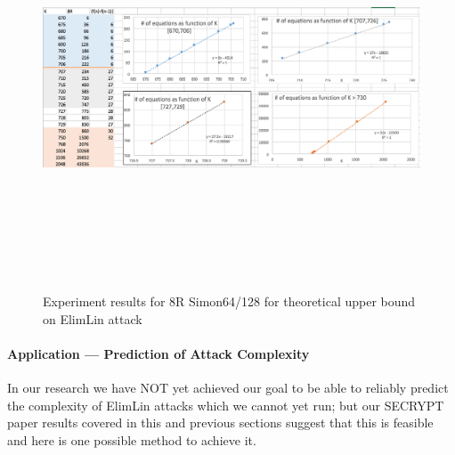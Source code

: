 \begin{figure}[h!]
	\centering
	\begin{minipage}[b][22cm][b]{12cm}
		\begin{turn}{90}
			\includegraphics*[width=220mm, height = 120mm]{./pics/ch6BigScreen.png}
			\end{turn}
			\end{minipage}
			\begin{turn}{90}
				\begin{minipage}[c][1cm][c]{22cm}
					\caption{Experiment results for 8R Simon64/128 for theoretical upper bound on ElimLin attack }
					\label{fig:FullResBig}
					\end{minipage} 
					\end{turn}
					\end{figure}



\paragraph{Application --- Prediction of Attack Complexity}
In our research we have NOT yet achieved our goal to be able to reliably predict the complexity of ElimLin attacks which we cannot yet run; but our SECRYPT paper results covered in this and previous sections suggest that this is feasible and here is one possible method to achieve it. 

